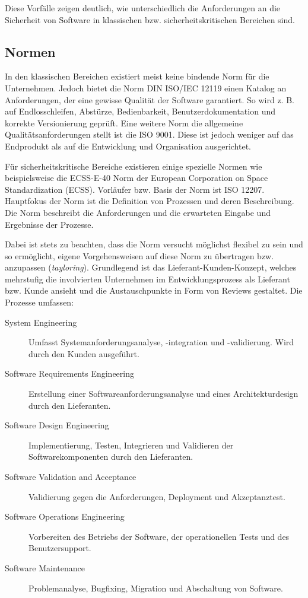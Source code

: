 Diese Vorfälle zeigen deutlich, wie unterschiedlich die Anforderungen an die Sicherheit von Software in klassischen bzw. sicherheitskritischen Bereichen sind.

\subsection{Normen} %

In den klassischen Bereichen existiert meist keine bindende Norm für die Unternehmen.
Jedoch bietet die Norm DIN ISO/IEC 12119 einen Katalog an Anforderungen, der eine gewisse Qualität der Software garantiert.
So wird z. B. auf Endlosschleifen, Abstürze, Bedienbarkeit, Benutzerdokumentation und korrekte Versionierung geprüft. 
Eine weitere Norm die allgemeine Qualitätsanforderungen stellt ist die ISO 9001.
Diese ist jedoch weniger auf das Endprodukt als auf die Entwicklung und Organisation ausgerichtet.
\parencite[Vgl.][S. 66 - 67]{Hohler:1998aa}


Für sicherheitskritische Bereiche existieren einige spezielle Normen wie beispielsweise die ECSS-E-40 Norm der European Corporation on Space Standardization (ECSS).
Vorläufer bzw. Basis der Norm ist ISO 12207.
Hauptfokus der Norm ist die Definition von Prozessen und deren Beschreibung. 
Die Norm beschreibt die Anforderungen und die erwarteten Eingabe und Ergebnisse der Prozesse.

Dabei ist stets zu beachten, dass die Norm versucht möglichst flexibel zu sein und so ermöglicht, eigene Vorgehensweisen auf diese Norm zu übertragen bzw. anzupassen (\emph{tayloring}).
Grundlegend ist das Lieferant-Kunden-Konzept, welches mehrstufig die involvierten Unternehmen im Entwicklungsprozess als Lieferant bzw. Kunde ansieht und die Austauschpunkte in Form von Reviews gestaltet.
Die Prozesse umfassen:
\begin{description}
\item[System Engineering] Umfasst Systemanforderungsanalyse, -integration und -validierung. 
Wird durch den Kunden ausgeführt.
\item[Software Requirements Engineering] Erstellung einer Softwareanforderungsanalyse und eines Architekturdesign durch den Lieferanten.
\item[Software Design Engineering] Implementierung, Testen, Integrieren und Validieren der Softwarekomponenten durch den Lieferanten.
\item[Software Validation and Acceptance] Validierung gegen die Anforderungen, Deployment und Akzeptanztest.
\item[Software Operations Engineering] Vorbereiten des Betriebs der Software, der operationellen Tests und des Benutzersupport.
\item[Software Maintenance] Problemanalyse, Bugfixing, Migration und Abschaltung von Software.
\end{description}

